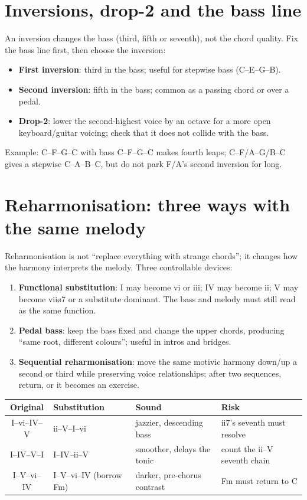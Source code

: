 \section{Inversions, drop-2 and the bass line}

An inversion changes the bass (third, fifth or seventh), not the chord quality. Fix the bass line first, then choose the inversion:

\begin{itemize}
  \item \textbf{First inversion}: third in the bass; useful for stepwise bass (C--E--G--B).
  \item \textbf{Second inversion}: fifth in the bass; common as a passing chord or over a pedal.
  \item \textbf{Drop-2}: lower the second-highest voice by an octave for a more open keyboard/guitar voicing; check that it does not collide with the bass.
\end{itemize}

Example: C--F--G--C with bass C--F--G--C makes fourth leaps; C--F/A--G/B--C gives a stepwise C--A--B--C, but do not park F/A's second inversion for long.

\section{Reharmonisation: three ways with the same melody}

Reharmonisation is not ``replace everything with strange chords''; it changes how the harmony interprets the melody. Three controllable devices:

\begin{enumerate}
  \item \textbf{Functional substitution}: I may become vi or iii; IV may become ii; V may become viiø7 or a substitute dominant. The bass and melody must still read as the same function.
  \item \textbf{Pedal bass}: keep the bass fixed and change the upper chords, producing ``same root, different colours''; useful in intros and bridges.
  \item \textbf{Sequential reharmonisation}: move the same motivic harmony down/up a second or third while preserving voice relationships; after two sequences, return, or it becomes an exercise.
\end{enumerate}

\begin{center}
\small
\begin{tabular}{clll}
\toprule
Original & Substitution & Sound & Risk \\
\midrule
I--vi--IV--V & ii--V--I--vi & jazzier, descending bass & ii7's seventh must resolve \\
I--IV--V--I & I--IV--ii--V & smoother, delays the tonic & count the ii--V seventh chain \\
I--V--vi--IV & I--V--vi--IV (borrow Fm) & darker, pre-chorus contrast & Fm must return to C \\
\bottomrule
\end{tabular}
\end{center}

